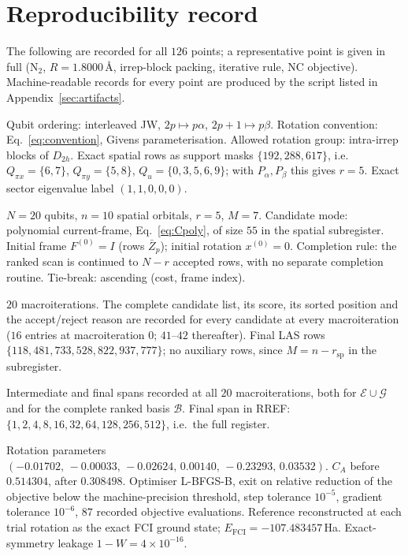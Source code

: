 \documentclass[11pt]{article}
\newcommand{\Ecal}{\mathcal E}
\newcommand{\Gcal}{\mathcal G}
\newcommand{\Bcal}{\mathcal B}
\newcommand{\Zb}{\bar Z}
\newcommand{\rsp}{r_{\mathrm{sp}}}
\begin{document}
\section{Reproducibility record}
\label{sec:record}

The following are recorded for all $126$ points; a representative point is
given in full ($\mathrm{N_2}$, $R=1.8000$\,\AA, irrep-block packing, iterative
rule, NC objective). Machine-readable records for every point are produced by
the script listed in Appendix~\ref{sec:artifacts}.

\begin{description}[leftmargin=1.6em,style=nextline,itemsep=3pt]

\item[Frame and exact set.]
Qubit ordering: interleaved JW, $2p\mapsto p\alpha$, $2p+1\mapsto p\beta$.
Rotation convention: Eq.~\eqref{eq:convention}, Givens parameterisation.
Allowed rotation group: intra-irrep blocks of $D_{2h}$.
Exact spatial rows as support masks $\{192,288,617\}$, i.e.\
$Q_{\pi x}=\{6,7\}$, $Q_{\pi y}=\{5,8\}$, $Q_u=\{0,3,5,6,9\}$; with
$P_\alpha,P_\beta$ this gives $r=5$.
Exact sector eigenvalue label $(1,1,0,0,0)$.

\item[Problem specification.]
$N=20$ qubits, $n=10$ spatial orbitals, $r=5$, $M=7$.
Candidate mode: polynomial current-frame, Eq.~\eqref{eq:Cpoly}, of size $55$ in
the spatial subregister.
Initial frame $F^{(0)}=I$ (rows $\Zb_p$); initial rotation $x^{(0)}=0$.
Completion rule: the ranked scan is continued to $N-r$ accepted rows, with no
separate completion routine.
Tie-break: ascending (cost, frame index).

\item[Per-iteration scan.]
$20$ macroiterations. The complete candidate list, its score, its sorted
position and the accept/reject reason are recorded for every candidate at every
macroiteration ($16$ entries at macroiteration $0$; $41$--$42$ thereafter).
Final LAS rows $\{118,481,733,528,822,937,777\}$; no auxiliary rows, since
$M=n-\rsp$ in the subregister.

\item[Binary spans.]
Intermediate and final spans recorded at all $20$ macroiterations, both for
$\Ecal\cup\Gcal$ and for the complete ranked basis $\Bcal$. Final span in RREF:
$\{1,2,4,8,16,32,64,128,256,512\}$, i.e.\ the full register.

\item[Orbitals, optimiser, state.]
Rotation parameters
$(-0.01702,\,-0.00033,\,-0.02624,\,0.00140,\,-0.23293,\,0.03532)$.
$C_A$ before $0.514304$, after $0.308498$.
Optimiser L-BFGS-B, exit on relative reduction of the objective below the
machine-precision threshold, step tolerance $10^{-5}$, gradient tolerance
$10^{-6}$, $87$ recorded objective evaluations.
Reference reconstructed at each trial rotation as the exact FCI ground state;
$E_{\mathrm{FCI}}=-107.483457$\,Ha.
Exact-symmetry leakage $1-W=4\times10^{-16}$.


\end{description}
\end{document}
